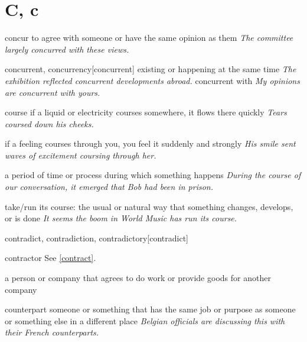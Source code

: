 \section{C, c}

\begin{DefWord}{concur}
    to agree with someone or have the same opinion as them
    \textit{The committee largely concurred with these views.}
\end{DefWord}

\begin{DefWord}{concurrent, concurrency}[concurrent]
    existing or happening at the same time
    \textit{The exhibition reflected concurrent developments abroad.}
    concurrent with
    \textit{My opinions are concurrent with yours.}
\end{DefWord}

\begin{DefWord}{course}
    if a liquid or electricity courses somewhere, it flows there quickly
    \textit{Tears coursed down his cheeks.}

    if a feeling courses through you, you feel it suddenly and strongly
    \textit{His smile sent waves of excitement coursing through her.}

    a period of time or process during which something happens
    \textit{During the course of our conversation, it emerged that Bob had been in prison.}

    take/run its course: the usual or natural way that something changes, develops, or is done
    \textit{It seems the boom in World Music has run its course.}
\end{DefWord}

\begin{DefWord}{contradict, contradiction, contradictory}[contradict]
\end{DefWord}

\begin{DefWord}{contractor}
    See \ref{contract}.

    a person or company that agrees to do work or provide goods for another company
\end{DefWord}


\begin{DefWord}{counterpart}
    someone or something that has the same job or purpose as someone or something else in a different place
    \textit{Belgian officials are discussing this with their French counterparts.}
\end{DefWord}

